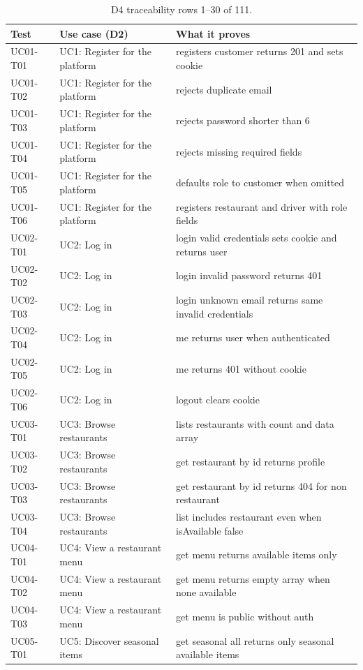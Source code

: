\begin{table}[t]
\caption{D4 traceability rows 1--30 of 111.}
\label{tab:d4t1}
\centering\scriptsize
\begin{tabular}{p{3.2cm}p{4.0cm}p{5.8cm}}
\toprule
Test & Use case (D2) & What it proves \\
\midrule
UC01-T01 & UC1: Register for the platform & registers customer returns 201 and sets cookie \\
UC01-T02 & UC1: Register for the platform & rejects duplicate email \\
UC01-T03 & UC1: Register for the platform & rejects password shorter than 6 \\
UC01-T04 & UC1: Register for the platform & rejects missing required fields \\
UC01-T05 & UC1: Register for the platform & defaults role to customer when omitted \\
UC01-T06 & UC1: Register for the platform & registers restaurant and driver with role fields \\
UC02-T01 & UC2: Log in & login valid credentials sets cookie and returns user \\
UC02-T02 & UC2: Log in & login invalid password returns 401 \\
UC02-T03 & UC2: Log in & login unknown email returns same invalid credentials \\
UC02-T04 & UC2: Log in & me returns user when authenticated \\
UC02-T05 & UC2: Log in & me returns 401 without cookie \\
UC02-T06 & UC2: Log in & logout clears cookie \\
UC03-T01 & UC3: Browse restaurants & lists restaurants with count and data array \\
UC03-T02 & UC3: Browse restaurants & get restaurant by id returns profile \\
UC03-T03 & UC3: Browse restaurants & get restaurant by id returns 404 for non restaurant \\
UC03-T04 & UC3: Browse restaurants & list includes restaurant even when isAvailable false \\
UC04-T01 & UC4: View a restaurant menu & get menu returns available items only \\
UC04-T02 & UC4: View a restaurant menu & get menu returns empty array when none available \\
UC04-T03 & UC4: View a restaurant menu & get menu is public without auth \\
UC05-T01 & UC5: Discover seasonal items & get seasonal all returns only seasonal available items \\

\end{tabular}
\end{table}
